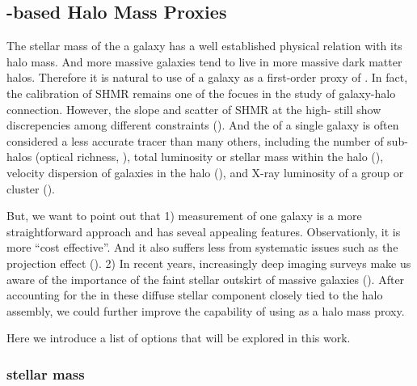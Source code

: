 \documentclass[a4paper,fleqn,usenatbib]{mnras}
\begin{document}

\subsection{\mstar{}-based Halo Mass Proxies}
    \label{sec:proxy_mstar}
    
    The stellar mass of the a galaxy has a well established physical relation with its halo mass.
    And more massive galaxies tend to live in more massive dark matter halos.
    Therefore it is natural to use \mstar{} of a galaxy as a first-order proxy of \mvir{}.
    In fact, the calibration of SHMR remains one of the focues in the study of galaxy-halo connection.
    However, the slope and scatter of SHMR at the high-\mstar{} still show discrepencies among 
    different constraints (\addref{}). 
    And the \mstar{} of a single galaxy is often considered a less accurate \mvir{} tracer 
    than many others, including the number of sub-halos (optical richness, \addref{}), 
    total luminosity or stellar mass within the halo (\addref{}), velocity dispersion of galaxies
    in the halo (\addref{}), and X-ray luminosity of a group or cluster (\addref{}). 
    
    But, we want to point out that 
    1) \mstar{} measurement of one galaxy is a more straightforward approach and has seveal 
    appealing features. Observationly, it is more ``cost effective''. And it also suffers less
    from systematic issues such as the projection effect (\addref{}).
    2) In recent years, increasingly deep imaging surveys make us aware of the importance of the 
    faint stellar outskirt of massive galaxies (\addref{}). 
    After accounting for the \mstar{} in these diffuse stellar component closely tied to the 
    halo assembly, we could further improve the capability of using \mstar{} as a halo mass proxy.
    
    Here we introduce a list of \mstar{} options that will be explored in this work.


\subsubsection{\cmodel{} stellar mass}
    \label{sec:mcmodel}
    
\end{document}
